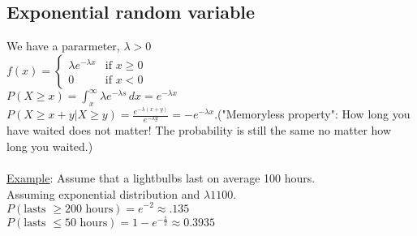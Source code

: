   \subsection*{Exponential random variable}
    We have a pararmeter, $\lambda > 0$\\
    $f(x) = \begin{cases} \lambda e^{-\lambda x} & \text{if } x \ge 0\\
    0 & \text{if } x < 0\end{cases}$\\
    $P(X \ge x) = \int_x^{\infty} \lambda e^{-\lambda s}\,dx = e^{-\lambda x}$\\
    $P(X \ge x+y| X \ge y) = \frac{e^{-\lambda(x+y)}}{e^{-\lambda y}} = 
    -e^{-\lambda x}$.("Memoryless property": How long you have waited
    does not matter! The probability is still the same no matter how long
    you waited.)\\\\
    \underline{Example}: Assume that a lightbulbs last on average 100 hours.\\
      Assuming exponential distribution and $\lambda{1}{100}$.\\
      $P(\text{lasts } \ge 200 \text{ hours}) = e^{-2} \approx .135$\\
      $P(\text{lasts } \le 50 \text{ hours}) = 1 - e^{-\frac{1}{2}} \approx 
       0.3935$\\
